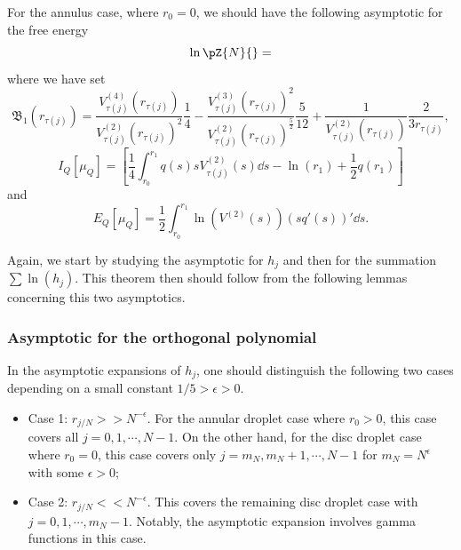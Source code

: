 \begin{teorema}
	For the annulus case, where $r_0 = 0$, we should have the following asymptotic for the free energy
	\begin{equation}
		\ln{\pZ{N}{}} = 
	\end{equation}
	where we have set
	\begin{equation}
		\mathfrak{B}_1(r_{\tau(j)})  = \frac{V^{(4)}_{\tau(j)}(r_{\tau(j)})}{V^{(2)}_{\tau(j)}(r_{\tau(j)})^2} \frac{1}{4} - \frac{V^{(3)}_{\tau(j)}(r_{\tau(j)})^2}{V^{(2)}_{\tau(j)}(r_{\tau(j)})^{\frac{5}{2}}} \frac{5}{12} + \frac{1}{V^{(2)}_{\tau(j)}(r_{\tau(j)})} \frac{2}{3 r_{\tau(j)}},
	\end{equation}
	\begin{equation}
		I_Q[\mu_Q] = \left[\frac{1}{4} \int_{r_0}^{r_1} q(s) s V^{(2)}_{\tau(j)}(s) \dd s- \ln(r_1) + \frac{1}{2} q(r_1) \right]
	\end{equation}
	and
	\begin{equation}
		E_Q[\mu_Q] = \frac{1}{2} \int_{r_0}^{r_1} \ln(V^{(2)}(s)) (sq'(s))' \dd s.
	\end{equation}
	\label{Theorem: Disk Free Energy}
\end{teorema}

Again, we start by studying the asymptotic for $h_j$ and then for the summation $\sum \ln(h_j)$. This theorem then should follow from the following lemmas concerning this two asymptotics.

\subsubsection{Asymptotic for the orthogonal polynomial}

In the asymptotic expansions of $h_j$, one should distinguish the following two cases depending on a small constant $1/5 > \epsilon > 0$. 
\begin{itemize}
	\item Case 1: $r_{j/N} >> N^{-\epsilon}$. For the annular droplet case where $r_0 > 0$, this case covers all $j = 0, 1, \cdots , N-1$. On the other hand, for the disc droplet case where $r_0 = 0$, this case covers only $j = m_N, m_N + 1, \cdots , N-1$ for $m_N = N^\epsilon$ with some $\epsilon > 0$;
	\item Case 2: $r_{j/N} << N^{-\epsilon}$. This covers the remaining disc droplet case with $j = 0, 1, \cdots, m_N-1$. Notably, the asymptotic expansion involves gamma functions in this case. 
\end{itemize}


